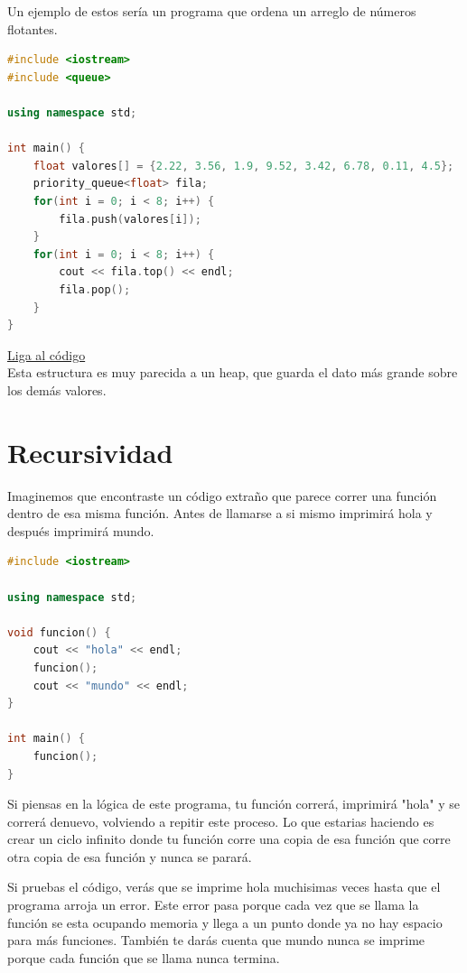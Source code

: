 \documentclass{article}
\begin{document}
Un ejemplo de estos sería un programa que ordena un arreglo de números flotantes.

\begin{lstlisting}[language=C++, caption=Filas de prioridad]
#include <iostream>
#include <queue>

using namespace std;

int main() {
    float valores[] = {2.22, 3.56, 1.9, 9.52, 3.42, 6.78, 0.11, 4.5};
    priority_queue<float> fila;
    for(int i = 0; i < 8; i++) {
        fila.push(valores[i]);
    }
    for(int i = 0; i < 8; i++) {
        cout << fila.top() << endl;
        fila.pop();
    }
}
\end{lstlisting}
\href{https://repl.it/@Jamesscn/Prioridades}{Liga al código} \\

Esta estructura es muy parecida a un heap, que guarda el dato más grande sobre los demás valores.

\section{Recursividad}

Imaginemos que encontraste un código extraño que parece correr una función dentro de esa misma función. Antes de llamarse a si mismo imprimirá hola y después imprimirá mundo.

\begin{lstlisting}[language=C++, caption=Funciones]
#include <iostream>

using namespace std;

void funcion() {
    cout << "hola" << endl;
    funcion();
    cout << "mundo" << endl;
}

int main() {
    funcion();
}
\end{lstlisting}

Si piensas en la lógica de este programa, tu función correrá, imprimirá "hola" y se correrá denuevo, volviendo a repitir este proceso. Lo que estarias haciendo es crear un ciclo infinito donde tu función corre una copia de esa función que corre otra copia de esa función y nunca se parará.

Si pruebas el código, verás que se imprime hola muchisimas veces hasta que el programa arroja un error. Este error pasa porque cada vez que se llama la función se esta ocupando memoria y llega a un punto donde ya no hay espacio para más funciones. También te darás cuenta que mundo nunca se imprime porque cada función que se llama nunca termina.
\end{document}
